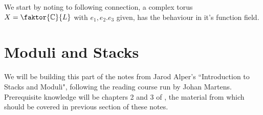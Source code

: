 \documentclass{article}
\begin{document}
We start by noting to following connection, a complex torus $X = \faktor{\mbb{C}}{L}$ with $e_1, e_2. e_3$ given, has the behaviour 
in it's function field. 


\part{Moduli and Stacks}
We will be building this part of the notes from Jarod Alper's ``Introduction to Stacks and Moduli", following the reading course run by Johan Martens. Prerequisite knowledge will be chapters 2 and 3 of \cite{Hartshorne1977}, the material from which should be covered in previous section of these notes. 





\end{document}
